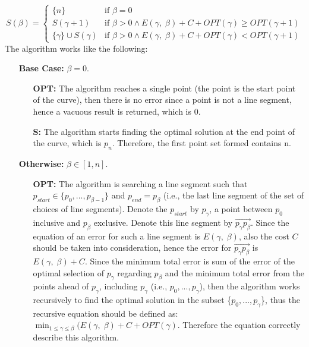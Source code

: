 \documentclass[10pt]{article}
\begin{document}
\begin{enumerate}
\begin{itemize}
\begin{mdframed}
           \begin{equation*}
              S(\beta) =
                \begin{cases}
                  \{n\} & \text{if $\beta = 0$}\\
                  S(\gamma + 1) & \text{if $\beta > 0 \wedge E(\gamma, \; \beta) + C + OPT(\gamma) \geq OPT(\gamma + 1)$}\\
                  \{\gamma\} \cup S(\gamma) & \text{if $\beta > 0 \wedge E(\gamma, \; \beta) + C + OPT(\gamma) < OPT(\gamma + 1)$}
                \end{cases}       
           \end{equation*}
           The algorithm works like the following:
           \begin{itemize}[leftmargin=20.7mm]
               \item[\textbf{Base Case:}] $\beta = 0.$
               \begin{itemize}
                   \item[\textbf{OPT:}] The algorithm reaches a single point (the point is the start point of the curve), then there is no error since a point is not a line segment, hence a vacuous result is returned, which is 0.
                   \item[\textbf{S:}] The algorithm starts finding the optimal solution at the end point of the curve, which is $p_n$. Therefore, the first point set formed contains n.
               \end{itemize}
               \item[\textbf{Otherwise:}] $\beta \in [1, n].$
               \begin{itemize}
                   \item[\textbf{OPT: }] The algorithm is searching a line segment such that $p_{start} \in \{p_0, ..., p_{\beta - 1}\}$ and $p_{end} = p_{\beta}$ (i.e., the last line segment of the set of choices of line segments). Denote the $p_{start}$ by $p_{\gamma}$, a point between $p_0$ inclusive and $p_{\beta}$ exclusive. Denote this line segment by $\overrightarrow{p_{\gamma}p_{\beta}}$. Since the equation of an error for such a line segment is $E(\gamma, \; \beta)$, also the cost $C$ should be taken into consideration, hence the error for $\overrightarrow{p_{\gamma}p_{\beta}}$ is $E(\gamma, \; \beta) + C$. Since the minimum total error is sum of the error of the optimal selection of $p_{\gamma}$ regarding $p_{\beta}$ and the minimum total error from the points ahead of $p_{\gamma}$, including $p_{\gamma}$ (i.e., $p_0, ..., p_{\gamma}$), then the algorithm works recursively to find the optimal solution in the subset \{$p_0, ..., p_{\gamma}$\}, thus the recursive equation should be defined as: $\min_{1 \leq \gamma \leq \beta}(E(\gamma, \; \beta) + C + OPT(\gamma)$. Therefore the equation correctly describe this algorithm.

\end{itemize}
\end{itemize}
\end{mdframed}
\end{itemize}
\end{enumerate}
\end{document}
